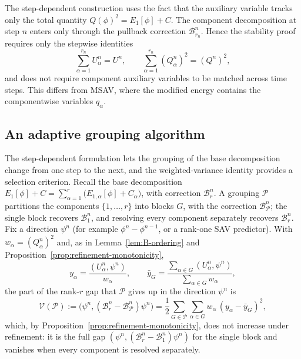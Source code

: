 \documentclass[10pt,onefignum,onetabnum,hidelinks]{siamart251216}
\begin{document}
\begin{remark}
\label{rem:step-dependent-vs-msav}
The step-dependent construction uses the fact that the auxiliary
variable tracks only the total quantity \(Q(\phi)^2=E_1[\phi]+C\). The component
decomposition at step \(n\) enters only through the pullback correction
\(\mathcal B_{r_n}^n\). Hence the stability proof requires only the stepwise
identities
\[
\sum_{\alpha=1}^{r_n} U_\alpha^n = U^n,
\qquad
\sum_{\alpha=1}^{r_n} (Q_\alpha^n)^2 = (Q^n)^2,
\]
and does not require component auxiliary variables to be matched across time
steps. This differs from MSAV, where the modified energy contains the
componentwise variables \(q_\alpha\).
\end{remark}

\subsection{An adaptive grouping algorithm}
\label{subsec:variance-guided-grouping}

The step-dependent formulation lets the grouping of the base decomposition change
from one step to the next, and the weighted-variance identity provides a selection criterion. Recall the base decomposition
$E_1[\phi]+C=\sum_{\alpha=1}^{r}\bigl(E_{1,\alpha}[\phi]+C_\alpha\bigr)$, with
correction $\mathcal B_r^n$. A grouping $\mathcal P$ partitions the components $\{1,\dots,r\}$ into blocks $G$, with the correction $\mathcal B_{\mathcal P}^n$; the single block recovers $\mathcal B_1^n$, and resolving every component separately recovers $\mathcal B_r^n$. Fix a direction
$\psi^n$ (for example $\phi^n-\phi^{n-1}$, or a rank-one SAV predictor). With
$w_\alpha=(Q_\alpha^n)^2$ and, as in Lemma~\ref{lem:B-ordering} and
Proposition~\ref{prop:refinement-monotonicity},
\[
y_\alpha=\frac{(U_\alpha^n,\psi^n)}{w_\alpha},
\qquad
\bar y_G=\frac{\sum_{\alpha\in G}(U_\alpha^n,\psi^n)}{\sum_{\alpha\in G}w_\alpha},
\]
the part of the rank-$r$ gap that $\mathcal P$ gives up in the direction $\psi^n$ is
\[
\mathcal V(\mathcal P)
:=\bigl(\psi^n,(\mathcal B_r^n-\mathcal B_{\mathcal P}^n)\psi^n\bigr)
=\frac12\sum_{G\in\mathcal P}\sum_{\alpha\in G}w_\alpha\,(y_\alpha-\bar y_G)^2 ,
\]
which, by Proposition~\ref{prop:refinement-monotonicity}, does not increase under
refinement: it is the full gap $(\psi^n,(\mathcal B_r^n-\mathcal B_1^n)\psi^n)$ for
the single block and vanishes when every component is resolved separately.
\end{document}
